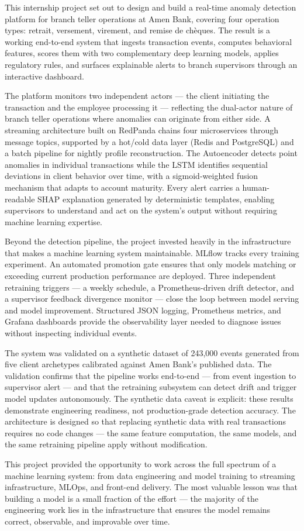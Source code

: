 This internship project set out to design and build a real-time anomaly
detection platform for branch teller operations at Amen Bank, covering
four operation types: retrait, versement, virement, and remise de
chèques. The result is a working end-to-end system that ingests
transaction events, computes behavioral features, scores them with two
complementary deep learning models, applies regulatory rules, and
surfaces explainable alerts to branch supervisors through an interactive
dashboard.

The platform monitors two independent actors --- the client initiating
the transaction and the employee processing it --- reflecting the
dual-actor nature of branch teller operations where anomalies can
originate from either side. A streaming architecture built on RedPanda
chains four microservices through message topics, supported by a
hot/cold data layer (Redis and PostgreSQL) and a batch pipeline for
nightly profile reconstruction. The Autoencoder detects point anomalies
in individual transactions while the LSTM identifies sequential
deviations in client behavior over time, with a sigmoid-weighted fusion
mechanism that adapts to account maturity. Every alert carries a
human-readable SHAP explanation generated by deterministic templates,
enabling supervisors to understand and act on the system's output
without requiring machine learning expertise.

Beyond the detection pipeline, the project invested heavily in the
infrastructure that makes a machine learning system maintainable. MLflow
tracks every training experiment. An automated promotion gate ensures
that only models matching or exceeding current production performance
are deployed. Three independent retraining triggers --- a weekly
schedule, a Prometheus-driven drift detector, and a supervisor feedback
divergence monitor --- close the loop between model serving and model
improvement. Structured JSON logging, Prometheus metrics, and Grafana
dashboards provide the observability layer needed to diagnose issues
without inspecting individual events.

The system was validated on a synthetic dataset of 243,000 events
generated from five client archetypes calibrated against Amen Bank's
published data. The validation confirms that the pipeline works
end-to-end --- from event ingestion to supervisor alert --- and that
the retraining subsystem can detect drift and trigger model updates
autonomously. The synthetic data caveat is explicit: these results
demonstrate engineering readiness, not production-grade detection
accuracy. The architecture is designed so that replacing synthetic
data with real transactions requires no code changes --- the same
feature computation, the same models, and the same retraining
pipeline apply without modification.

This project provided the opportunity to work across the full spectrum
of a machine learning system: from data engineering and model training
to streaming infrastructure, MLOps, and front-end delivery. The most
valuable lesson was that building a model is a small fraction of the
effort --- the majority of the engineering work lies in the
infrastructure that ensures the model remains correct, observable, and
improvable over time.